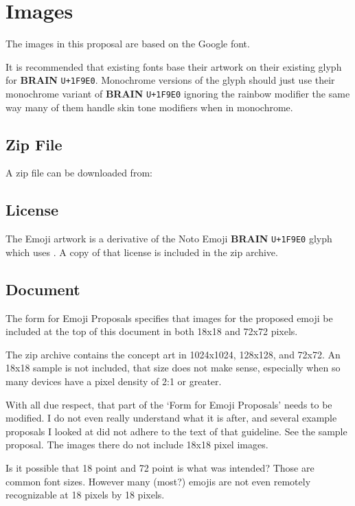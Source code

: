 \section{Images}

The images in this proposal are based on the Google\textsuperscript{\textregistered}
 font.

It is recommended that existing fonts base their artwork on their existing glyph for
\textbf{BRAIN} \texttt{U+1F9E0}. Monochrome versions of the glyph should just use their
monochrome variant of \textbf{BRAIN} \texttt{U+1F9E0} ignoring the rainbow modifier the
same way many of them handle skin tone modifiers when in monochrome.

\subsection{Zip File}
A zip file can be downloaded from:

\subsection{License}

The Emoji artwork is a derivative of the Noto Emoji \textbf{BRAIN} \texttt{U+1F9E0} glyph
which uses .
A copy of that license is included in the zip archive.

\subsection{Document}

The form for Emoji Proposals specifies that images for the proposed emoji be included at
the top of this document in both 18x18 and 72x72 pixels.

The zip archive contains the concept art in 1024x1024, 128x128, and 72x72. An 18x18 sample
is not included, that size does not make sense, especially when so many devices have a pixel
density of 2:1 or greater.

With all due respect, that part of the `Form for Emoji Proposals' needs to be modified. I do
not even really understand what it is after, and several example proposals I looked at did
not adhere to the text of that guideline. See the
sample proposal. The images there do not include 18x18 pixel images.

Is it possible that 18 point and 72 point is what was intended? Those are common font sizes.
However many (most?) emojis are not even remotely recognizable at 18 pixels by 18 pixels.

